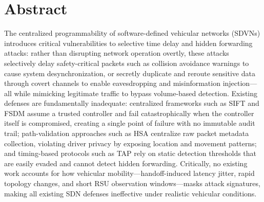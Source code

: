 \documentclass[12pt, a4paper]{report}
\begin{document}


\renewcommand{\thepage}{\roman{page}} %


\chapter*{Abstract}



The centralized programmability of software-defined vehicular networks
(SDVNs) introduces critical vulnerabilities to selective time delay and
hidden forwarding attacks: rather than disrupting network operation
overtly, these attacks selectively delay safety-critical packets such as
collision avoidance warnings to cause system desynchronization, or
secretly duplicate and reroute sensitive data through covert channels to
enable eavesdropping and misinformation injection---all while mimicking
legitimate traffic to bypass volume-based detection.
Existing defenses are fundamentally
inadequate: centralized frameworks such as SIFT and FSDM assume a trusted
controller and fail catastrophically when the controller itself is
compromised, creating a single point of failure with no immutable audit
trail; path-validation approaches such as HSA centralize raw packet
metadata collection, violating driver privacy by exposing location and
movement patterns; and timing-based protocols such as TAP rely on static
detection thresholds that are easily evaded and cannot detect hidden
forwarding. Critically, no existing work accounts for how vehicular
mobility---handoff-induced latency jitter, rapid topology changes, and
short RSU observation windows---masks attack signatures, making all
existing SDN defenses ineffective under realistic vehicular conditions.
\end{document}
